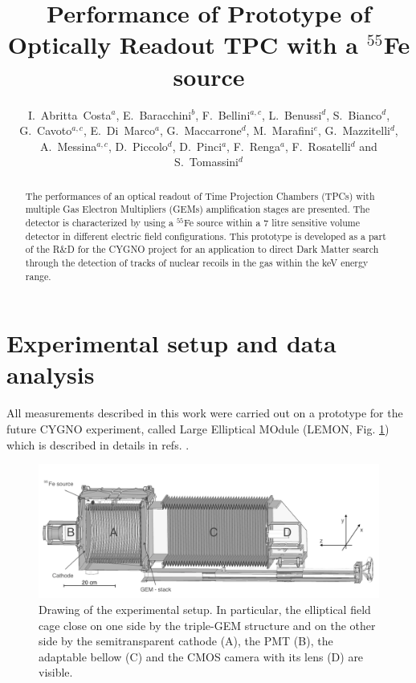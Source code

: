 \documentclass[a4paper]{jpconf}
\begin{document}
\title{Performance of Prototype of Optically Readout TPC with a $^{55}$Fe source}

\author{
{I.~Abritta~Costa}$^{a}$,
{E.~Baracchini}$^{b}$,
{F.~Bellini}$^{a,c}$,
{L.~Benussi}$^{d}$,
{S.~Bianco}$^{d}$,
{G.~Cavoto}$^{a,c}$,
{E.~Di~Marco}$^{a}$,
{G.~Maccarrone}$^{d}$,
{M.~Marafini}$^{e}$,
{G.~Mazzitelli}$^{d}$,
{A.~Messina}$^{a,c}$,
{D.~Piccolo}$^{d}$,
{D.~Pinci}$^{a}$,
{F.~Renga}$^{a}$,
{F.~Rosatelli}$^{d}$ and
{S.~Tomassini}$^{d}$
\\
\address{$^a$ Istituto~Nazionale~di~Fisica~Nucleare,  
 Sezione di Roma, I-00185, Italy}
\address{$^b$ Gran~Sasso~Science~Institute~L'Aquila, I-67100, Italy}
\address{$^c$ Dipartimento di Fisica, Sapienza Universit\`a di Roma, I-00185, Italy} 
\address{$^d$ Istituto Nazionale di Fisica Nucleare,  Laboratori Nazionali di Frascati, I-00040, Italy}
\address{$^e$ Museo Storico della Fisica e Centro Studi e Ricerche "Enrico Fermi", Piazza del Viminale 1, Roma, I-00184, Italy}
}


\begin{abstract}
The performances of an optical readout of Time Projection Chambers
(TPCs) with multiple Gas Electron Multipliers (GEMs) amplification
stages are presented.  The detector is characterized by using a
$^{55}$Fe source within a 7 litre sensitive volume detector in
different electric field configurations.  This prototype is developed
as a part of the R\&D for the CYGNO project for an application to
direct Dark Matter search through the detection of tracks of nuclear
recoils in the gas within the keV energy range.
\end{abstract}

\section{Experimental setup and data analysis}
\label{sec:daq}

All measurements described in this work were carried out on a prototype for the future CYGNO experiment, called Large Elliptical MOdule (LEMON, Fig. \ref{fig:lemon})
which is described in details in refs. \cite{bib:eps, bib:ieee17, bib:ieee18}.

\begin{figure}[htbp]
\centering
\includegraphics[width=.85\textwidth]{sex_bw-2.png}
\caption{Drawing of the experimental setup.
In particular, the elliptical field cage close on one side by the triple-GEM structure and on the other 
side by the semitransparent cathode (A), 
the PMT (B), 
the adaptable bellow (C) and the CMOS camera with its lens (D) 
are visible.}
\label{fig:lemon}
\end{figure}
\end{document}

